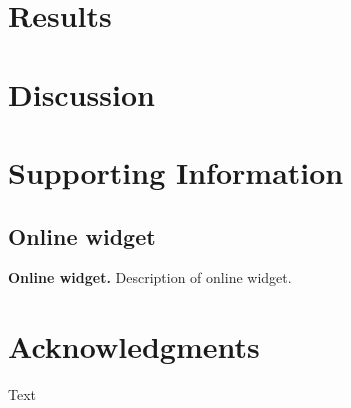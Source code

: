\documentclass[10pt,letterpaper]{article}\usepackage[]{graphicx}\usepackage[]{color}
\begin{document}
% 
% 
% 
% 
% 
% 
% 
% 
% 
% 
% 
% 



\section*{Results}

\section*{Discussion}

\section*{Supporting Information}

\subsection*{Online widget}
\label{online_widget}
{\bf Online widget.} Description of online widget.

\section*{Acknowledgments}

Text

\nolinenumbers



\end{document}
